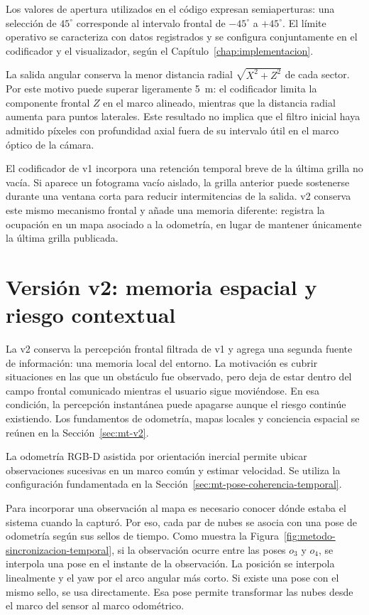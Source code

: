 Los valores de apertura utilizados en el código expresan semiaperturas: una selección de
$45^\circ$ corresponde al intervalo frontal de $-45^\circ$ a $+45^\circ$.
El límite operativo se caracteriza con datos registrados y se configura conjuntamente en
el codificador y el visualizador, según el Capítulo~\ref{chap:implementacion}.

La salida angular conserva la menor distancia radial $\sqrt{X^2+Z^2}$ de cada sector. Por este
motivo puede superar ligeramente \SI{5}{\metre}: el codificador limita la componente frontal
$Z$ en el marco alineado, mientras que la distancia radial aumenta para puntos laterales.
Este resultado no implica que el filtro inicial haya admitido píxeles con profundidad axial
fuera de su intervalo útil en el marco óptico de la cámara.

El codificador de v1 incorpora una retención temporal breve de la última grilla no vacía. Si
aparece un fotograma vacío aislado, la grilla anterior puede sostenerse durante una ventana corta
para reducir intermitencias de la salida. v2 conserva este mismo mecanismo frontal y añade una
memoria diferente: registra la ocupación en un mapa asociado a la odometría, en lugar de mantener
únicamente la última grilla publicada.

\section{Versión v2: memoria espacial y riesgo contextual}
\label{sec:metodo-v2}

La v2 conserva la percepción frontal filtrada de v1 y agrega una segunda fuente de información:
una memoria local del entorno. La motivación es cubrir situaciones en las que un obstáculo fue
observado, pero deja de estar dentro del campo frontal comunicado mientras el usuario sigue
moviéndose. En esa condición, la percepción instantánea puede apagarse aunque el riesgo continúe
existiendo.
Los fundamentos de odometría, mapas locales y conciencia espacial se reúnen en la
Sección~\ref{sec:mt-v2}.

La odometría RGB-D asistida por orientación inercial permite ubicar observaciones sucesivas en
un marco común y estimar velocidad. Se utiliza la configuración fundamentada en la
Sección~\ref{sec:mt-pose-coherencia-temporal}.

Para incorporar una observación al mapa es necesario conocer dónde estaba el sistema cuando la
capturó. Por eso, cada par de nubes se asocia con una pose de odometría según sus sellos de tiempo.
Como muestra la Figura~\ref{fig:metodo-sincronizacion-temporal}, si la observación ocurre entre las
poses $o_3$ y $o_4$, se interpola una pose en el instante de la observación. La posición se
interpola linealmente y el yaw por el arco angular más corto. Si existe una pose con el mismo
sello, se usa directamente. Esa pose permite transformar las nubes desde el marco del sensor
al marco odométrico.

